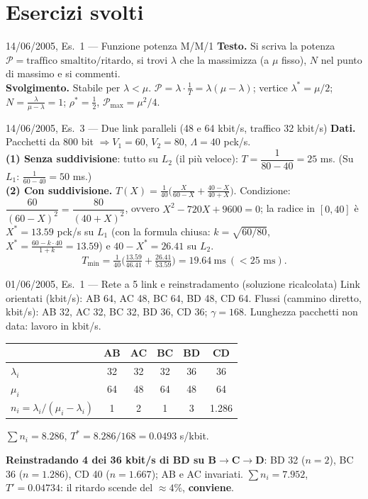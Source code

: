 \section{Esercizi svolti}

\begin{esempio}{14/06/2005, Es.~1 --- Funzione potenza M/M/1}
\textbf{Testo.} Si scriva la potenza $\mathcal P=\text{traffico smaltito}/\text{ritardo}$, si trovi $\lambda$ che la massimizza (a $\mu$ fisso), $N$ nel punto di massimo e si commenti.\\
\textbf{Svolgimento.} Stabile per $\lambda<\mu$. $\mathcal P=\lambda\cdot\tfrac1{T}=\lambda(\mu-\lambda)$; vertice $\lambda^*=\mu/2$; $N=\tfrac{\lambda}{\mu-\lambda}=1$; $\rho^*=\tfrac12$, $\mathcal P_{\max}=\mu^2/4$.
\end{esempio}

\begin{esempio}{14/06/2005, Es.~3 --- Due link paralleli (48 e 64 kbit/s, traffico 32 kbit/s)}
\textbf{Dati.} Pacchetti da 800 bit $\Rightarrow V_1=60$, $V_2=80$, $\Lambda=40$ pck/s.\\
\textbf{(1) Senza suddivisione}: tutto su $L_2$ (il più veloce): $T=\dfrac1{80-40}=25$ ms. (Su $L_1$: $\tfrac1{60-40}=50$ ms.)\\
\textbf{(2) Con suddivisione.} $T(X)=\tfrac1{40}\Big(\tfrac{X}{60-X}+\tfrac{40-X}{40+X}\Big)$. Condizione: $\dfrac{60}{(60-X)^2}=\dfrac{80}{(40+X)^2}$, ovvero $X^2-720X+9600=0$; la radice in $[0,40]$ è $X^*=13.59$ pck/s su $L_1$ (con la formula chiusa: $k=\sqrt{60/80}$, $X^*=\tfrac{60-k\cdot40}{1+k}=13.59$) e $40-X^*=26.41$ su $L_2$.
\[T_{\min}=\tfrac1{40}\Big(\tfrac{13.59}{46.41}+\tfrac{26.41}{53.59}\Big)=19.64\ \text{ms}\ (<25\text{ ms}).\]
\end{esempio}

\begin{esempio}{01/06/2005, Es.~1 --- Rete a 5 link e reinstradamento (soluzione ricalcolata\mio)}
Link orientati (kbit/s): AB 64, AC 48, BC 64, BD 48, CD 64. Flussi (cammino diretto, kbit/s): AB 32, AC 32, BC 32, BD 36, CD 36; $\gamma=168$. Lunghezza pacchetti non data: lavoro in kbit/s.
\begin{center}\small
\begin{tabular}{lccccc}
\toprule & AB & AC & BC & BD & CD\\\midrule
$\lambda_i$ & 32 & 32 & 32 & 36 & 36\\
$\mu_i$ & 64 & 48 & 64 & 48 & 64\\
$n_i=\lambda_i/(\mu_i-\lambda_i)$ & 1 & 2 & 1 & 3 & 1.286\\\bottomrule
\end{tabular}
\end{center}
$\sum n_i=8.286$, $T^*=8.286/168=0.0493$ s/kbit.

\textbf{Reinstradando 4 dei 36 kbit/s di BD su B$\to$C$\to$D}: BD 32 ($n=2$), BC 36 ($n=1.286$), CD 40 ($n=1.667$); AB e AC invariati. $\sum n_i=7.952$, $T'=0.04734$: il ritardo scende del $\approx4\%$, \textbf{conviene}.
\end{esempio}

